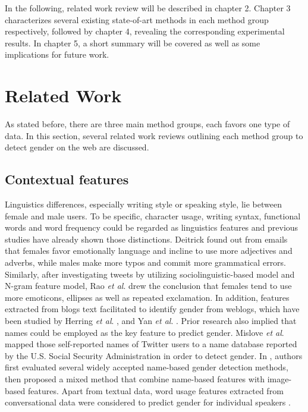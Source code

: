 \documentclass[runningheads]{llncs}
\begin{document}
	In the following, related work review will be described in chapter 2. Chapter 3 characterizes several existing state-of-art methods in each method group respectively, followed by chapter 4, revealing the corresponding experimental results. In chapter 5, a short summary will be covered as well as some implications for future work. 

	
	\section{Related Work}
	
	As stated before, there are three main method groups, each favors one type of data. In this section, several related work reviews outlining each method group to detect gender on the web are discussed. 
	
	\subsection{Contextual features}
	
	Linguistics differences, especially writing style or speaking style, lie between female and male users. To be specific, character usage, writing syntax, functional words and word frequency could be regarded as linguistics features \cite{deitrick2012author} and previous studies have already shown those distinctions. Deitrick \cite{deitrick2012author} found out from emails that females favor emotionally language and incline to use more adjectives and adverbs, while males make more typos and commit more grammatical errors. Similarly, after investigating tweets by utilizing sociolinguistic-based model and N-gram feature model, Rao \textit{et al}. \cite{rao2010classifying} drew the conclusion that females tend to use more emoticons, ellipses as well as repeated exclamation. In addition, features extracted from blogs text facilitated to identify gender from weblogs, which have been studied by Herring \textit{et al}. \cite{herring2004bridging}, and Yan \textit{et al}. \cite{yan2006gender}. Prior research also implied that names could be employed as the key feature to predict gender. Mislove \textit{et al}. \cite{mislove2011understanding} mapped those self-reported names of Twitter users to a name database reported by the U.S. Social Security Administration in order to detect gender.  In \cite{karimi2016inferring}, authors first evaluated several widely accepted name-based gender detection methods, then proposed a mixed method that combine name-based features with image-based features. Apart from textual data, word usage features extracted from conversational data were considered  to predict gender for individual speakers \cite{gillick2010can}. 
	
\end{document}

